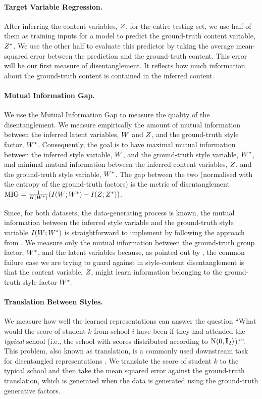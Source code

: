 \documentclass[../thesis.tex]{subfiles}
\begin{document}
\paragraph{Target Variable Regression.} After inferring the content variables, $\myrv{z}$, for the entire testing set, we use half of them as training inputs for a model to predict the ground-truth content variable, $\myrv{z}^{*}$. We use the other half to evaluate this predictor by taking the average mean-squared error between the prediction and the ground-truth content. This error will be our first measure of disentanglement. It reflects how much information about the ground-truth content is contained in the inferred content.

\paragraph{Mutual Information Gap.} We use the Mutual Information Gap \citep{chen2018isolating} to measure the quality of the disentanglement. We measure empirically the amount of mutual information between the inferred latent variables, $\myrv{w}$ and $\myrv{z}$, and the ground-truth style factor, $\myrv{w}^{*}$. Consequently, the goal is to have maximal mutual information between the inferred style variable, $\myrv{w}$, and the ground-truth style variable, $\myrv{w}^{*}$, and minimal mutual information between the inferred content variables, $\myrv{z}$, and the ground-truth style variable, $\myrv{w}^{*}$. The gap between the two (normalised with the entropy of the ground-truth factors) is the metric of disentanglement $\mathrm{MIG} = \frac{1}{H(\myrv{w}^{*})} (I(\myrv{w}; \myrv{w}^{*}) - I(\myrv{z}; \myrv{z}^{*}))$. 

Since, for both datasets, the data-generating process is known, the mutual information between the inferred style variable and the ground-truth style variable $I(\myrv{w}; \myrv{w}^{*})$ is straightforward to implement by following the approach from \citet{chen2018isolating}. We measure only the mutual information between the ground-truth group factor, $\myrv{w}^{*}$, and the latent variables because, as pointed out by \citet{nemethAdversarialDisentanglementGrouped2020}, the common failure case we are trying to guard against in style-content disentanglement is that the content variable, $\myrv{z}$, might learn information belonging to the ground-truth style factor $\myrv{w}^{*}$.

\paragraph{Translation Between Styles.} We measure how well the learned representations can answer the question ``What would the score of student $k$ from school $i$ have been if they had attended the \textit{typical} school (i.e., the school with scores distributed according to $\mathrm{N} (0, \mymatrix{i}_2)$)?''. This problem, also known as translation, is a commonly used downstream task for disentangled representations \citep{tenenbaum2000separating}. We translate the score of student $k$ to the typical school and then take the mean squared error against the ground-truth translation, which is generated when the data is generated using the ground-truth generative factors. 
\end{document}
